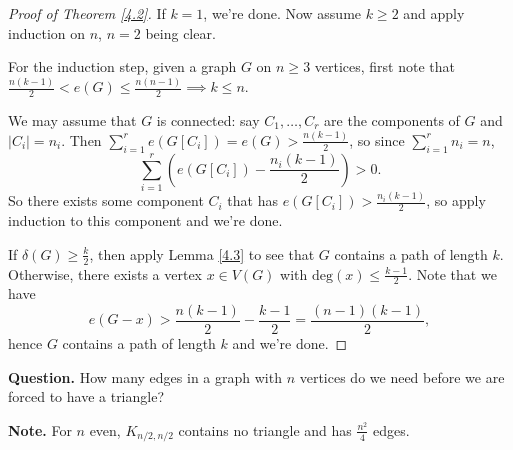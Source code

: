 \documentclass{article}
\theoremstyle{definition}
\begin{document}
\begin{proof}[Proof of Theorem \ref{4.2}]
    If $k=1$, we're done. Now assume $k\ge 2$ and apply induction on $n$, $n=2$ being clear.
    \vspace{1mm}
    
    For the induction step, given a graph $G$ on $n\ge 3$ vertices, first note that $\frac{n(k-1)}{2} < e(G) \le \frac{n(n-1)}{2} \implies k \le n$. 
    \vspace{1mm}
    
    We may assume that $G$ is connected: say $C_1,\ldots,C_r$ are the components of $G$ and $|C_i|=n_i$. Then $\sum_{i=1}^{r} e(G[C_i]) = e(G) > \frac{n(k-1)}{2}$, so since $\sum_{i=1}^{r} n_i = n$, \[
    \sum_{i=1}^{r} \left(e(G[C_i]) - \frac{n_i(k-1)}{2}\right) > 0.
    \]
    So there exists some component $C_i$ that has $e(G[C_i]) > \frac{n_i(k-1)}{2}$, so apply induction to this component and we're done.
    \vspace{1mm}
    
    If $\delta(G)\ge \frac{k}{2}$, then apply Lemma \ref{4.3} to see that $G$ contains a path of length $k$. Otherwise, there exists a vertex $x \in V(G)$ with $\text{deg}(x) \le \frac{k-1}{2}$. Note that we have $$e(G-x) > \frac{n(k-1)}{2} - \frac{k-1}{2} = \frac{(n-1)(k-1)}{2},$$ hence $G$ contains a path of length $k$ and we're done.
\end{proof}


\textbf{Question.} How many edges in a graph with $n$ vertices do we need before we are forced to have a triangle?

\textbf{Note.} For $n$ even, $K_{n/2,n/2}$ contains no triangle and has $\frac{n^2}{4}$ edges.
\end{document}
